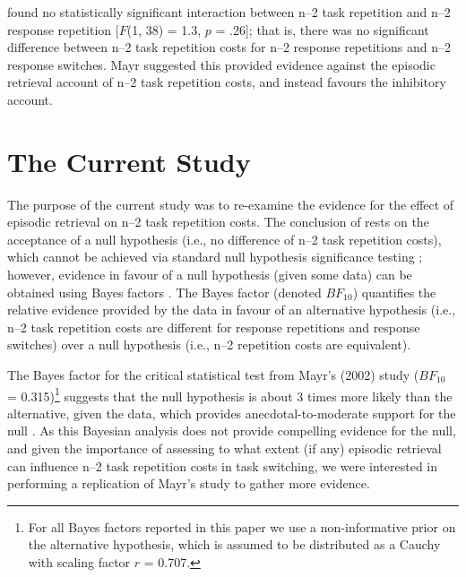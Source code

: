 \documentclass[a4paper, man, natbib]{apa6}
\begin{document}
\cite{Mayr2002} found no statistically significant interaction between n--2 task repetition and n--2 response repetition [$F$(1, 38) = 1.3, $p$ = .26]; that is, there was no significant difference between n--2 task repetition costs for n--2 response repetitions and n--2 response switches. Mayr suggested this provided evidence against the episodic retrieval account of n--2 task repetition costs, and instead favours the inhibitory account.

\section{The Current Study}
The purpose of the current study was to re-examine the evidence for the effect of episodic retrieval on n--2 task repetition costs. The conclusion of \cite{Mayr2002} rests on the acceptance of a null hypothesis (i.e., no difference of n--2 task repetition costs), which cannot be achieved via standard null hypothesis significance testing \citep{Gallistel2009, Wagenmakers2007}; however, evidence in favour of a null hypothesis (given some data) can be obtained using Bayes factors \citep[e.g.,][]{Rouder2009}. The Bayes factor (denoted $BF_{10}$) quantifies the relative evidence provided by the data in favour of an alternative hypothesis (i.e., n--2 task repetition costs are different for response repetitions and response switches) over a null hypothesis (i.e., n--2 repetition costs are equivalent). 

The Bayes factor for the critical statistical test from Mayr's (2002) study ($BF_{10}$ = 0.315)\footnote{For all Bayes factors reported in this paper we use a non-informative prior on the alternative hypothesis, which is assumed to be distributed as a Cauchy with scaling factor $r$ = 0.707.} suggests that the null hypothesis is about 3 times more likely than the alternative, given the data, which provides anecdotal-to-moderate support for the null \citep[e.g.,][]{Schoenbrodtinpress}. As this Bayesian analysis does not provide compelling evidence for the null, and given the importance of assessing to what extent (if any) episodic retrieval can influence n--2 task repetition costs in task switching, we were interested in performing a replication of Mayr's study to gather more evidence.
\end{document}
